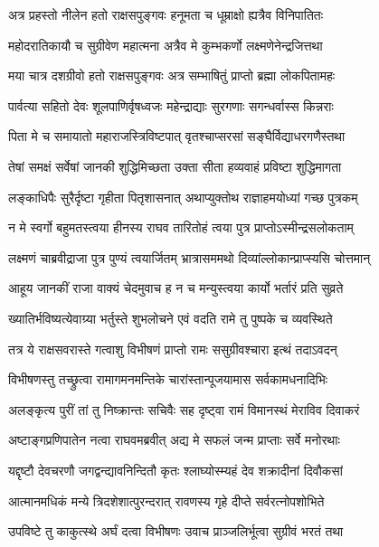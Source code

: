 \twolineshloka
{अत्र प्रहस्तो नीलेन हतो राक्षसपुङ्गवः}
{हनूमता च धूम्राक्षो ह्यत्रैव विनिपातितः}%

\twolineshloka
{महोदरातिकायौ च सुग्रीवेण महात्मना}
{अत्रैव मे कुम्भकर्णो लक्ष्मणेनेन्द्रजित्तथा}%

\twolineshloka
{मया चात्र दशग्रीवो हतो राक्षसपुङ्गवः}
{अत्र सम्भाषितुं प्राप्तो ब्रह्मा लोकपितामहः}%

\twolineshloka
{पार्वत्या सहितो देवः शूलपाणिर्वृषध्वजः}
{महेन्द्राद्याः सुरगणाः सगन्धर्वास्स किन्नराः}%

\twolineshloka
{पिता मे च समायातो महाराजस्त्रिविष्टपात्}
{वृतश्चाप्सरसां सङ्घैर्विद्याधरगणैस्तथा}%

\twolineshloka
{तेषां समक्षं सर्वेषां जानकी शुद्धिमिच्छता}
{उक्ता सीता हव्यवाहं प्रविष्टा शुद्धिमागता}%

\twolineshloka
{लङ्काधिपैः सुरैर्दृष्टा गृहीता पितृशासनात्}
{अथाप्युक्तोथ राज्ञाहमयोध्यां गच्छ पुत्रकम्}%

\twolineshloka
{न मे स्वर्गो बहुमतस्त्वया हीनस्य राघव}
{तारितोहं त्वया पुत्र प्राप्तोऽस्मीन्द्रसलोकताम्}%

\twolineshloka
{लक्ष्मणं चाब्रवीद्राजा पुत्र पुण्यं त्वयार्जितम्}
{भ्रात्रासममथो दिव्यांल्लोकान्प्राप्स्यसि चोत्तमान्}%

\twolineshloka
{आहूय जानकीं राजा वाक्यं चेदमुवाच ह}
{न च मन्युस्त्वया कार्यो भर्तारं प्रति सुव्रते}%

\twolineshloka
{ख्यातिर्भविष्यत्येवाग्र्या भर्तुस्ते शुभलोचने}
{एवं वदति रामे तु पुष्पके च व्यवस्थिते}%

\twolineshloka
{तत्र ये राक्षसवरास्ते गत्वाशु विभीषणं}
{प्राप्तो रामः ससुग्रीवश्चारा इत्थं तदाऽवदन्}%

\twolineshloka
{विभीषणस्तु तच्छ्रुत्वा रामागमनमन्तिके}
{चारांस्तान्पूजयामास सर्वकामधनादिभिः}%

\twolineshloka
{अलङ्कृत्य पुरीं तां तु निष्क्रान्तः सचिवैः सह}
{दृष्ट्वा रामं विमानस्थं मेराविव दिवाकरं}%

\twolineshloka
{अष्टाङ्गप्रणिपातेन नत्वा राघवमब्रवीत्}
{अद्य मे सफलं जन्म प्राप्ताः सर्वे मनोरथाः}%

\twolineshloka
{यद्दृष्टौ देवचरणौ जगद्वन्द्यावनिन्दितौ}
{कृतः श्लाघ्योस्म्यहं देव शक्रादीनां दिवौकसां}%

\twolineshloka
{आत्मानमधिकं मन्ये त्रिदशेशात्पुरन्दरात्}
{रावणस्य गृहे दीप्ते सर्वरत्नोपशोभिते}%

\twolineshloka
{उपविष्टे तु काकुत्स्थे अर्घं दत्वा विभीषणः}
{उवाच प्राञ्जलिर्भूत्वा सुग्रीवं भरतं तथा}%

